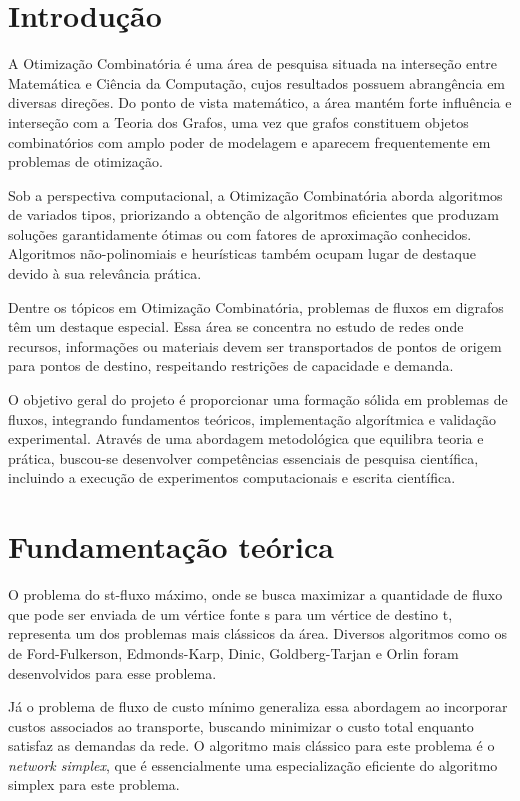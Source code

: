 \documentclass[12pt,a4paper]{article}
\begin{document}
\section{Introdução}
A Otimização Combinatória é uma área de pesquisa situada na interseção entre Matemática e Ciência da Computação, cujos resultados possuem abrangência em diversas direções. Do ponto de vista matemático, a área mantém forte influência e interseção com a Teoria dos Grafos, uma vez que grafos constituem objetos combinatórios com amplo poder de modelagem e aparecem frequentemente em problemas de otimização. 

Sob a perspectiva computacional, a Otimização Combinatória aborda algoritmos de variados tipos, priorizando a obtenção de algoritmos eficientes que produzam soluções garantidamente ótimas ou com fatores de aproximação conhecidos. Algoritmos não-polinomiais e heurísticas também ocupam lugar de destaque devido à sua relevância prática.

Dentre os tópicos em Otimização Combinatória, problemas de fluxos em digrafos têm um destaque especial. Essa área se concentra no estudo de redes onde recursos, informações ou materiais devem ser transportados de pontos de origem para pontos de destino, respeitando restrições de capacidade e demanda. 

O objetivo geral do projeto é proporcionar uma formação sólida em problemas de fluxos, integrando fundamentos teóricos, implementação algorítmica e validação experimental. Através de uma abordagem metodológica que equilibra teoria e prática, buscou-se desenvolver competências essenciais de pesquisa científica, incluindo a execução de experimentos computacionais e escrita científica.

\section{Fundamentação teórica}
O problema do st-fluxo máximo, onde se busca maximizar a quantidade de fluxo que pode ser enviada de um vértice fonte s para um vértice de destino t, representa um dos problemas mais clássicos da área. Diversos algoritmos como os de Ford-Fulkerson, Edmonds-Karp, Dinic, Goldberg-Tarjan e Orlin foram desenvolvidos para esse problema. 

Já o problema de fluxo de custo mínimo generaliza essa abordagem ao incorporar custos associados ao transporte, buscando minimizar o custo total enquanto satisfaz as demandas da rede. O algoritmo mais clássico para este problema é o \textit{network simplex}, que é essencialmente uma especialização eficiente do algoritmo simplex para este problema. 
\end{document}
